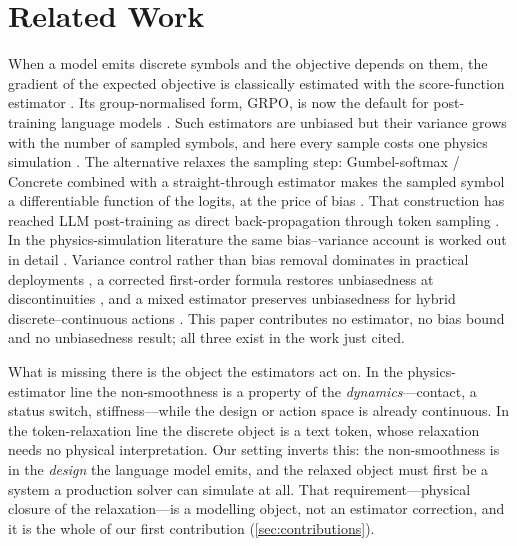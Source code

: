 \section{Related Work}
\label{sec:related}

When a model emits discrete symbols and the objective depends on them, the
gradient of the expected objective is classically estimated with the
score-function estimator \cite{williams1992reinforce,greensmith2004variance,schulman2015gradient}.  Its group-normalised
form, GRPO, is now the default for post-training language models
\cite{shao2024grpo}.  Such estimators are unbiased but their variance grows
with the number of sampled symbols, and here every sample costs one physics
simulation \cite{mohamed2020mcgrad}.  The alternative relaxes the sampling step:
Gumbel-softmax / Concrete combined with a straight-through estimator makes the
sampled symbol a differentiable function of the logits, at the price of bias
\cite{jang2017gumbel,maddison2017concrete,bengio2013ste,kingma2014auto,tucker2017rebar,grathwohl2018backpropagation}.  That construction has
reached LLM post-training as direct back-propagation through token sampling
\cite{grade2026,diffro2025,hu2023abs}.  In the physics-simulation literature the
same bias--variance account is worked out in detail \cite{suh2022diffsim}.
Variance control rather than bias removal dominates in practical deployments
\cite{onoda2026ddcg}, a corrected first-order formula restores unbiasedness at
discontinuities \cite{scheffler2026cfobg}, and a mixed
estimator preserves unbiasedness for hybrid discrete--continuous actions
\cite{hpo2026}.  This paper contributes no estimator, no bias bound and no
unbiasedness result; all three exist in the work just cited.

What is missing there is the object the estimators act on.  In the
physics-estimator line the non-smoothness is a property of the \emph{dynamics}---contact, a status switch, stiffness---while the design or action space is already
continuous.  In the token-relaxation line the discrete object is a text token, whose
relaxation needs no physical interpretation.  Our
setting inverts this: the non-smoothness is in the \emph{design} the language
model emits, and the relaxed object must first be a system a production solver
can simulate at all.  That requirement---physical closure of the relaxation---is
a modelling object, not an estimator correction, and it is the whole of our
first contribution (\cref{sec:contributions}).

